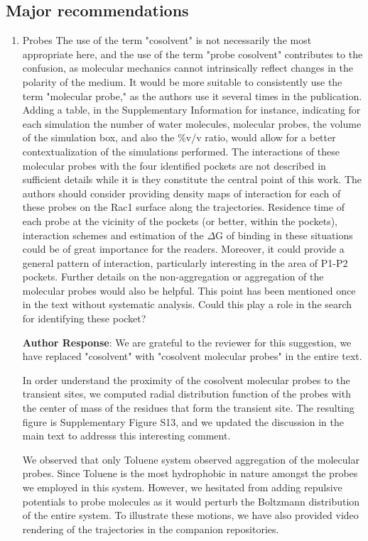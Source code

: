 \documentclass[11pt, a4paper]{article}
\begin{document}
\subsection{Major recommendations}
\begin{enumerate}
    \item Probes
    The use of the term "cosolvent" is not necessarily the most appropriate here, and the use of the term "probe cosolvent" contributes to the confusion, as molecular mechanics cannot intrinsically reflect changes in the polarity of the medium. It would be more suitable to consistently use the term "molecular probe," as the authors use it several times in the publication. Adding a table, in the Supplementary Information for instance, indicating for each simulation the number of water molecules, molecular probes, the volume of the simulation box, and also the \%v/v ratio, would allow for a better contextualization of the simulations performed.
    The interactions of these molecular probes with the four identified pockets are not described in sufficient details while it is they constitute the central point of this work. The authors should consider providing density maps of interaction for each of these probes on the Rac1 surface along the trajectories. Residence time of each probe at the vicinity of the pockets (or better, within the pockets), interaction schemes and estimation of the $\Delta$G of binding in these situations could be of great importance for the readers. Moreover, it could provide a general pattern of interaction, particularly interesting in the area of P1-P2 pockets.
    Further details on the non-aggregation or aggregation of the molecular probes would also be helpful. This point has been mentioned once in the text without systematic analysis. Could this play a role in the search for identifying these pocket?

    \textbf{Author Response}: We are grateful to the reviewer for this suggestion, we have replaced "cosolvent" with "cosolvent molecular probes" in the entire text. 

    In order understand the proximity of the cosolvent molecular probes to the transient sites, we computed radial distribution function of the probes with the center of mass of the residues that form the transient site. The resulting figure is Supplementary Figure S13, and we updated the discussion in the main text to addresss this interesting comment. 

    We observed that only Toluene system observed aggregation of the molecular probes. Since Toluene is the most hydrophobic in nature amongst the probes we employed in this system. However, we hesitated from adding repulsive potentials to probe molecules as it would perturb the Boltzmann distribution of the entire system. To illustrate these motions, we have also provided video rendering of the trajectories in the companion repositories.


\end{enumerate}
\end{document}
